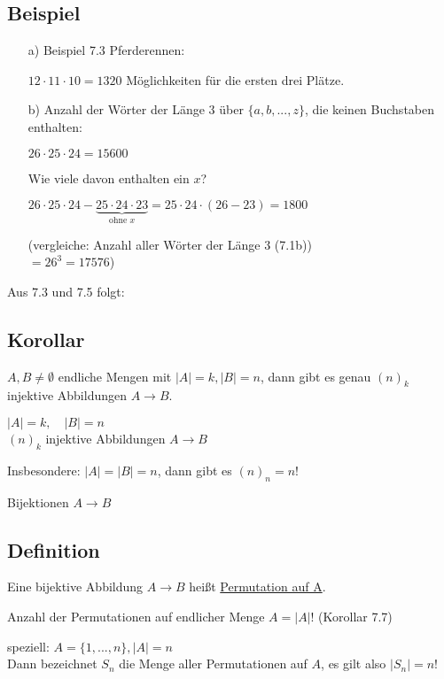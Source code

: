 \documentclass[a4paper, 12pt, twoside] {article}
\begin{document}
\subsection{Beispiel} %
\begin{itemize}

\item[a)] Beispiel 7.3 Pferderennen:

$12 \cdot 11 \cdot 10 = 1320$ Möglichkeiten für die ersten drei Plätze.

\item[b)] Anzahl der Wörter der Länge $3$ über $\{a, b, ... ,z\}$, die keinen Buchstaben enthalten:

$26 \cdot 25 \cdot 24 = 15600$

Wie viele davon enthalten ein $x$?

$26 \cdot 25 \cdot 24 - \underbrace{25 \cdot 24 \cdot 23}_{\text{ohne } x} = 25 \cdot 24 \cdot (26 - 23) = 1800$

(vergleiche: Anzahl aller Wörter der Länge $3$ (7.1b)) \\
$= 26^3 = 17576$)

\end{itemize}

Aus 7.3 und 7.5 folgt:

\subsection{Korollar} %

$A, B \neq \emptyset$ endliche Mengen mit $|A| = k, |B| = n$, dann gibt es genau $(n)_k$ injektive Abbildungen $A \rightarrow B$.

$|A| = k, \quad |B| = n$ \\
$(n)_k$ injektive Abbildungen $A \rightarrow B$

Insbesondere: $|A| = |B| = n$, dann gibt es $(n)_n = n!$

Bijektionen $A \rightarrow B$

\subsection{Definition} %

Eine bijektive Abbildung $A \rightarrow B$ heißt \uline{Permutation auf A}.

Anzahl der Permutationen auf endlicher Menge $A = |A| !$ (Korollar 7.7)

speziell: $A = \{1, ..., n\}, |A| = n$ \\
Dann bezeichnet $S_n$ die Menge aller Permutationen auf $A$, es gilt also $|S_n| = n!$
\end{document}
